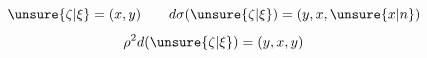 
\[
\unsure{\zeta|\xi}=(x,y)\qquad d\sigma(\unsure{\zeta|\xi})=(y,x,\unsure{x|n})
\]
\[
\rho^2d(\unsure{\zeta|\xi})=(y,x,y)
\]

